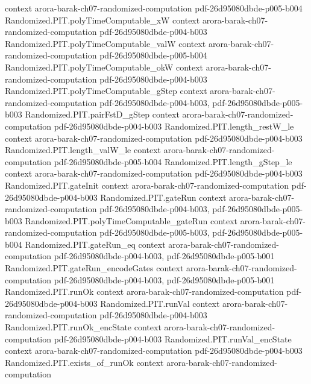 \begin{theorem}
  {context}
  {arora-barak-ch07-randomized-computation}
  {pdf-26d95080dbde-p005-b004}
\proofstep
  {Randomized.PIT.polyTimeComputable_xW}
  {context}
  {arora-barak-ch07-randomized-computation}
  {pdf-26d95080dbde-p004-b003}
\proofstep
  {Randomized.PIT.polyTimeComputable_valW}
  {context}
  {arora-barak-ch07-randomized-computation}
  {pdf-26d95080dbde-p005-b004}
\proofstep
  {Randomized.PIT.polyTimeComputable_okW}
  {context}
  {arora-barak-ch07-randomized-computation}
  {pdf-26d95080dbde-p004-b003}
\proofstep
  {Randomized.PIT.polyTimeComputable_gStep}
  {context}
  {arora-barak-ch07-randomized-computation}
  {pdf-26d95080dbde-p004-b003,
    pdf-26d95080dbde-p005-b003}
\proofstep
  {Randomized.PIT.pairFstD_gStep}
  {context}
  {arora-barak-ch07-randomized-computation}
  {pdf-26d95080dbde-p004-b003}
\proofstep
  {Randomized.PIT.length_restW_le}
  {context}
  {arora-barak-ch07-randomized-computation}
  {pdf-26d95080dbde-p004-b003}
\proofstep
  {Randomized.PIT.length_valW_le}
  {context}
  {arora-barak-ch07-randomized-computation}
  {pdf-26d95080dbde-p005-b004}
\proofstep
  {Randomized.PIT.length_gStep_le}
  {context}
  {arora-barak-ch07-randomized-computation}
  {pdf-26d95080dbde-p004-b003}
\proofstep
  {Randomized.PIT.gateInit}
  {context}
  {arora-barak-ch07-randomized-computation}
  {pdf-26d95080dbde-p004-b003}
\proofstep
  {Randomized.PIT.gateRun}
  {context}
  {arora-barak-ch07-randomized-computation}
  {pdf-26d95080dbde-p004-b003,
    pdf-26d95080dbde-p005-b003}
\proofstep
  {Randomized.PIT.polyTimeComputable_gateRun}
  {context}
  {arora-barak-ch07-randomized-computation}
  {pdf-26d95080dbde-p005-b003,
    pdf-26d95080dbde-p005-b004}
\proofstep
  {Randomized.PIT.gateRun_eq}
  {context}
  {arora-barak-ch07-randomized-computation}
  {pdf-26d95080dbde-p004-b003,
    pdf-26d95080dbde-p005-b001}
\proofstep
  {Randomized.PIT.gateRun_encodeGates}
  {context}
  {arora-barak-ch07-randomized-computation}
  {pdf-26d95080dbde-p004-b003,
    pdf-26d95080dbde-p005-b001}
\proofstep
  {Randomized.PIT.runOk}
  {context}
  {arora-barak-ch07-randomized-computation}
  {pdf-26d95080dbde-p004-b003}
\proofstep
  {Randomized.PIT.runVal}
  {context}
  {arora-barak-ch07-randomized-computation}
  {pdf-26d95080dbde-p004-b003}
\proofstep
  {Randomized.PIT.runOk_encState}
  {context}
  {arora-barak-ch07-randomized-computation}
  {pdf-26d95080dbde-p004-b003}
\proofstep
  {Randomized.PIT.runVal_encState}
  {context}
  {arora-barak-ch07-randomized-computation}
  {pdf-26d95080dbde-p004-b003}
\proofstep
  {Randomized.PIT.exists_of_runOk}
  {context}
  {arora-barak-ch07-randomized-computation}

\end{theorem}
